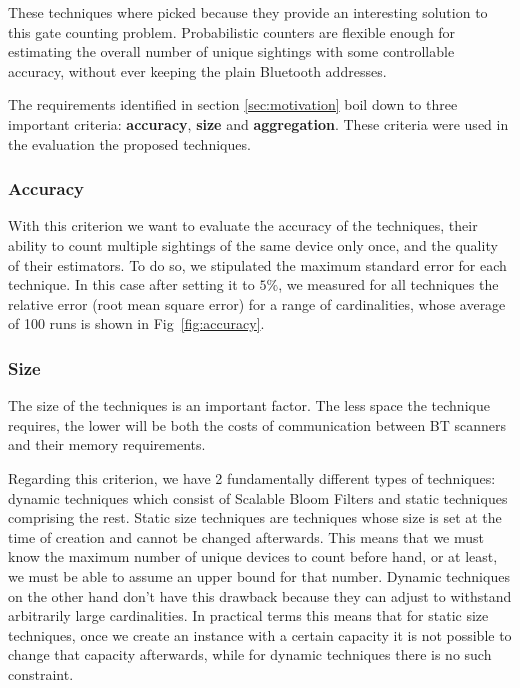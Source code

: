 These techniques where picked because they provide an interesting
solution to this gate counting problem. Probabilistic counters are
flexible enough for estimating the overall number of unique sightings
with some controllable accuracy, without ever keeping the plain
Bluetooth addresses.

The requirements identified in section \ref{sec:motivation} boil down
to three important criteria: \textbf{accuracy}, \textbf{size} and
\textbf{aggregation}. These criteria were used in the evaluation the
proposed techniques.



\subsubsection{Accuracy}
\label{sec:accuracy}

With this criterion we want to evaluate the accuracy of the
techniques, their ability to count multiple sightings of the same
device only once, and the quality of their estimators. To do so, we
stipulated the maximum standard error for each technique. In this case
after setting it to  $5\%$, we measured for all %
techniques the relative error (root mean square error) for a range of
cardinalities, whose average of 100 runs is shown in
Fig~\ref{fig:accuracy}.

\subsubsection{Size}
\label{sec:size}
The size of the techniques is an important factor. The less space the
technique requires, the lower will be both the costs of communication
between BT scanners and their memory requirements.

Regarding this criterion, we have 2 fundamentally different
types of techniques: dynamic techniques which consist of Scalable Bloom
Filters and static techniques comprising the rest. Static
size techniques are techniques whose size is set at the time of creation and
cannot be changed afterwards. This means that we must know the maximum
number of unique devices to count before hand, or at least, we must be able
to assume an upper bound for that number. Dynamic techniques on the other
hand don't have this drawback because they can adjust to withstand
arbitrarily large cardinalities. In practical terms this means that for
static size techniques, once we create an instance with a certain capacity
it is not possible to change that capacity afterwards, while for dynamic
techniques there is no such constraint.


